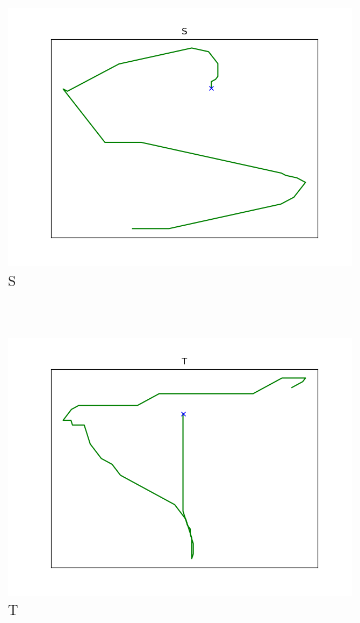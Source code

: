 \begin{figure}
\begin{subfigure}[b]{0.14\textwidth}
        \includegraphics[width=\textwidth]{images/gbem/orig_letters_fig/AORIG_letter_S_writer_1.png}
        \caption{S}
    \end{subfigure}
    ~
    \begin{subfigure}[b]{0.14\textwidth}
        \includegraphics[width=\textwidth]{images/gbem/orig_letters_fig/AORIG_letter_T_writer_1.png}
        \caption{T}
    \end{subfigure}
    ~
    \begin{subfigure}[b]{0.14\textwidth}

\end{subfigure}
\end{figure}

